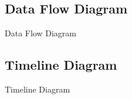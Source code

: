 \subsection{Data Flow Diagram}
\begin{frame}{Data Flow Diagram}
	
\end{frame}

\subsection{Timeline Diagram}
\begin{frame}{Timeline Diagram}
	
\end{frame}